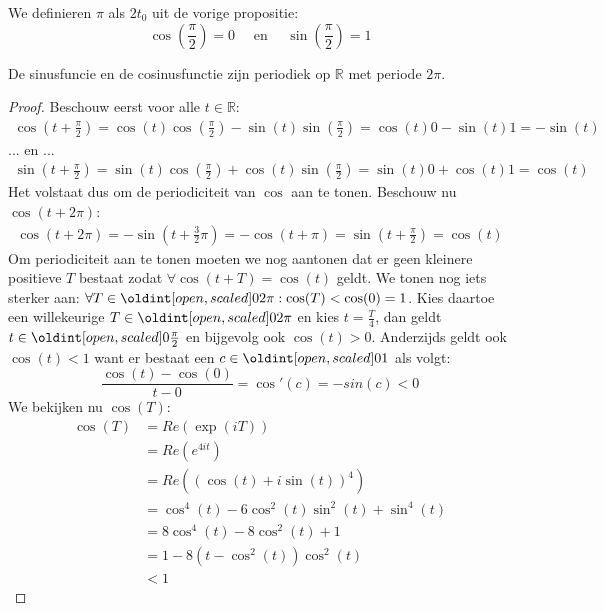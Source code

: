 \documentclass[main.tex]{subfiles}
\begin{document}
\begin{de}
  We definieren $\pi$ als $2t_{0}$ uit de vorige propositie:
  \[ \cos\left(\frac{\pi}{2}\right) = 0 \quad\text{ en }\quad \sin\left(\frac{\pi}{2}\right) = 1 \]
\end{de}

\begin{bpr}
  \label{pr:cos-en-sin-periodiek}
  De sinusfuncie en de cosinusfunctie zijn periodiek op $\mathbb{R}$ met periode $2\pi$.

  \begin{proof}
    Beschouw eerst voor alle $t\in \mathbb{R}$:
    \begin{align*}
      \cos\left(t+\frac{\pi}{2}\right)
      = \cos(t)\cos\left(\frac{\pi}{2}\right) - \sin(t)\sin\left(\frac{\pi}{2}\right)
      = \cos(t)0 - \sin(t)1
      = - \sin(t)
    \end{align*}
    ... en ...
    \begin{align*}
      \sin\left(t+\frac{\pi}{2}\right)
      = \sin(t)\cos\left(\frac{\pi}{2}\right) + \cos(t)\sin\left(\frac{\pi}{2}\right)
      = \sin(t)0 + \cos(t)1
      = \cos(t)
    \end{align*}
    Het volstaat dus om de periodiciteit van $\cos$ aan te tonen.
    Beschouw nu $\cos(t+2\pi)$:
    \begin{align*}
      \cos(t+2\pi)
      = -\sin\left(t+\frac{3}{2}\pi\right)
      = -\cos(t+\pi)
      = \sin\left(t + \frac{\pi}{2}\right)
      = \cos(t)
    \end{align*}
    Om periodiciteit aan te tonen moeten we nog aantonen dat er geen kleinere positieve $T$ bestaat zodat $\forall \cos(t+T)=\cos(t)$ geldt.
    We tonen nog iets sterker aan: $\forall T\in \interval[open]{0}{2\pi}: \cos(T) < \cos(0) = 1$.
    Kies daartoe een willekeurige $T\in \interval[open]{0}{2\pi}$ en kies $t=\frac{T}{4}$, dan geldt $t\in\interval[open]{0}{\frac{\pi}{2}}$ en bijgevolg ook $\cos(t) > 0$.
    Anderzijds geldt ook $\cos(t) < 1$ want er bestaat een $c\in \interval[open]{0}{1}$ als volgt:
    \[ \frac{\cos(t)-\cos(0)}{t-0} = \cos'(c) = -sin(c) < 0 \]
    We bekijken nu $\cos(T)$:
    \begin{align*}
      \cos(T)
      &= Re(\exp(iT))\\
      &= Re(e^{4it})\\
      &= Re\left(\left(\cos(t) +i\sin(t)\right)^{4}\right)\\
      &= \cos^{4}(t) - 6\cos^{2}(t)\sin^{2}(t) + \sin^{4}(t)\\
      &= 8\cos^{4}(t) - 8\cos^{2}(t) + 1\\
      &= 1-8\left(t-\cos^{2}(t)\right)\cos^{2}(t)\\
      &<1
    \end{align*}
  \end{proof}
\end{bpr}
\end{document}
